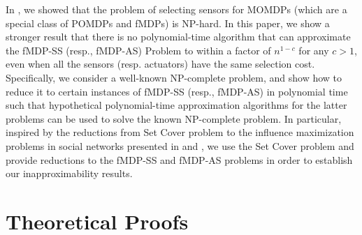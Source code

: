 \documentclass[twocolumn]{autart}    %
\begin{document}
In \cite{bhargav2023complexity}, we showed that the problem of selecting sensors for MOMDPs (which are a special class of POMDPs and fMDPs) is NP-hard. In this paper, we show a stronger result that there is no polynomial-time algorithm that can approximate the fMDP-SS (resp., fMDP-AS) Problem to within a factor of $n^{1- c}$ for any $c>1$, even when all the sensors (resp. actuators) have the same selection cost. Specifically, we consider a well-known NP-complete problem, and show how to reduce it to certain instances of fMDP-SS (resp., fMDP-AS) in polynomial time such that hypothetical polynomial-time approximation algorithms for the latter problems can be used to solve the known NP-complete problem.
In particular, inspired by the reductions from Set Cover problem to the influence maximization problems in social networks presented in \cite{kempe2003maximizing} and \cite{schoenebeck2019beyond}, we use the Set Cover problem and provide reductions to the fMDP-SS and fMDP-AS problems in order to establish our inapproximability results. 

\section{Theoretical Proofs}
\label{app:proofs}
\end{document}
